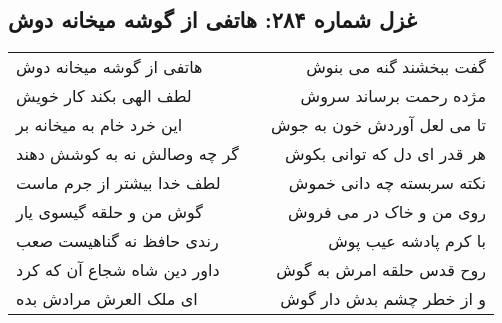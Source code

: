 \begin{center}
\section*{غزل شماره ۲۸۴: هاتفی از گوشه میخانه دوش}
\label{sec:sh284}
\begin{longtable}{l p{0.5cm} r}
هاتفی از گوشه میخانه دوش
&&
گفت ببخشند گنه می بنوش
\\
لطف الهی بکند کار خویش
&&
مژده رحمت برساند سروش
\\
این خرد خام به میخانه بر
&&
تا می لعل آوردش خون به جوش
\\
گر چه وصالش نه به کوشش دهند
&&
هر قدر ای دل که توانی بکوش
\\
لطف خدا بیشتر از جرم ماست
&&
نکته سربسته چه دانی خموش
\\
گوش من و حلقه گیسوی یار
&&
روی من و خاک در می فروش
\\
رندی حافظ نه گناهیست صعب
&&
با کرم پادشه عیب پوش
\\
داور دین شاه شجاع آن که کرد
&&
روح قدس حلقه امرش به گوش
\\
ای ملک العرش مرادش بده
&&
و از خطر چشم بدش دار گوش
\\
\end{longtable}
\end{center}
